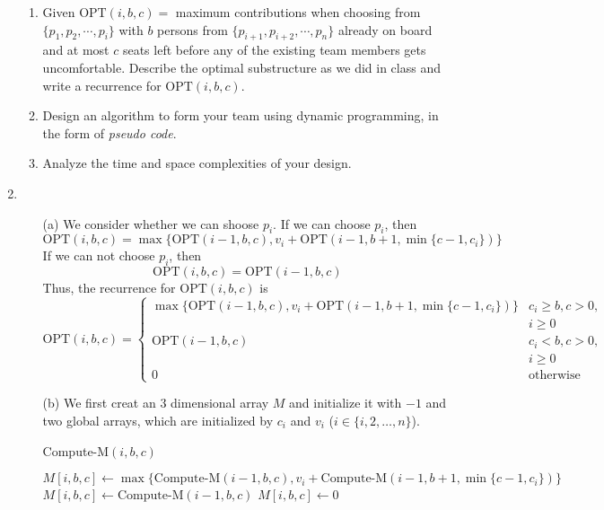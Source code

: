 \documentclass[12pt,a4paper]{article}
\makeatletter
\newtheorem*{solution}{Solution}
\theoremstyle{definition}
\renewenvironment{solution}[1][Solution] {\par\pushQED{\qed}\normalfont\topsep6\p@\@plus6\p@\relax\trivlist\item[\hskip\labelsep\bfseries#1\@addpunct{.}]\ignorespaces}{\popQED\endtrivlist\@endpefalse} \makeatother
\makeatother
\begin{document}
\begin{enumerate}
		\begin{enumerate}
			\item Given $\text{OPT}(i, b, c)=$ maximum contributions when choosing from $\{p_1, p_2, \cdots, p_i\}$ with $b$ persons from $\{p_{i+1}, p_{i+2}, \cdots, p_n\}$ already on board and at most $c$ seats left before any of the existing team members gets uncomfortable. Describe the optimal substructure as we did in class and write a recurrence for $\text{OPT}(i, b, c)$.
			\item Design an algorithm to form your team using dynamic programming, in the form of \emph{pseudo code}.
			\item Analyze the time and space complexities of your design.
		\end{enumerate}
		\begin{solution}
			\noindent
			\begin{enumerate}
				\item[(a)] We consider whether we can shoose $p_i$. If we can choose $p_i$, then 
				$$ \text{OPT}(i, b, c) = \max\{\text{OPT}(i - 1, b, c), v_i + \text{OPT}(i-1, b+1, \min\{c-1,c_i \} )\}$$ 
				If we can not choose $p_i$, then 
				$$ \text{OPT}(i, b, c) = \text{OPT}(i-1, b, c)$$
				Thus, the recurrence for $\text{OPT}(i, b, c)$ is 
				\begin{displaymath}
				\text{OPT}(i, b, c) = \left\{
				\begin{array}{ll}
				\max\{\text{OPT}(i - 1, b, c), v_i + \text{OPT}(i-1, b+1, \min\{c-1,c_i \} )\} & c_i \geq b, c > 0, \\ & i \geq 0 \\
				\text{OPT}(i-1, b, c) & c_i < b, c > 0, \\ & i \geq 0 \\
				0 & \textrm{otherwise}
				\end{array}
				\right.
				\end{displaymath}
				
				\item[(b)] \noindent
				We first creat an $3$ dimensional array $M$ and initialize it with $-1$ and two global arrays, which are initialized by $c_i$ and $v_i$ ($i \in \{i,2,\dots,n\}$).\\
				\begin{minipage}[t]{0.9\textwidth}
					\centering
					\begin{algorithm}[H]
						\BlankLine
						\caption{Compute-M$(i,b,c)$} \label{Alg-DP1}
						{
							$M[i,b,c] \leftarrow \max\{\textrm{Compute-M}(i-1,b,c), v_i + \textrm{Compute-M}(i-1, b+1, \min\{c-1,c_i \} )\}$
						}
						{
							$M[i,b,c] \leftarrow \textrm{Compute-M}(i-1,b,c)$
						}
						\Else
						{
							$M[i,b,c] \leftarrow 0$
						}
						

\end{algorithm}
\end{minipage}
\end{enumerate}
\end{solution}
\end{enumerate}
\end{document}
